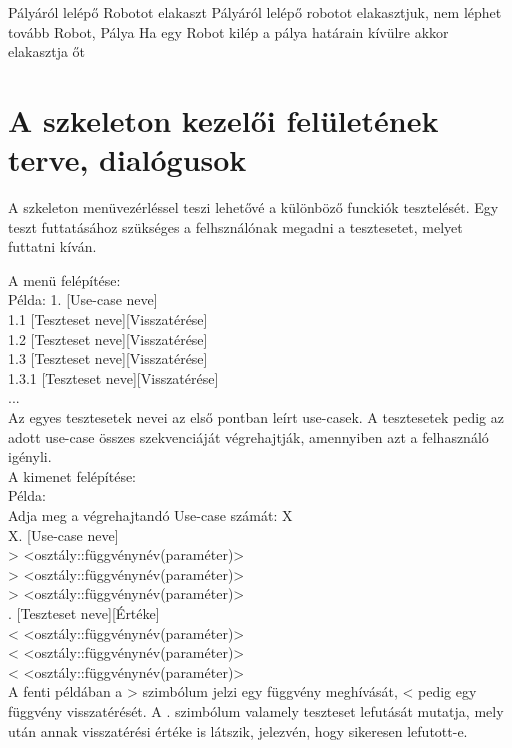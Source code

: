 \usecase%
{Pályáról lelépő Robotot elakaszt}%
{Pályáról lelépő robotot elakasztjuk, nem léphet tovább}%
{Robot, Pálya}%
{Ha egy Robot kilép a pálya határain kívülre akkor elakasztja őt}

\section{A szkeleton kezelői felületének terve, dialógusok}
A szkeleton menüvezérléssel teszi lehetővé a különböző funckiók tesztelését. Egy teszt futtatásához szükséges a felhsználónak
megadni a tesztesetet, melyet futtatni kíván. 

A menü felépítése: \\

Példa:
1. [Use-case neve] \\
1.1 [Teszteset neve][Visszatérése] \\
1.2 [Teszteset neve][Visszatérése] \\
1.3 [Teszteset neve][Visszatérése] \\
   1.3.1 [Teszteset neve][Visszatérése] \\
... \\

Az egyes tesztesetek nevei az első pontban leírt use-casek. A tesztesetek pedig
az adott use-case összes szekvenciáját végrehajtják, amennyiben azt a felhasználó igényli. \\

A kimenet felépítése: \\

Példa: \\

Adja meg a végrehajtandó Use-case számát: X \\
X. [Use-case neve] \\
>   <osztály::függvénynév(paraméter)> \\
>         <osztály::függvénynév(paraméter)> \\
>               <osztály::függvénynév(paraméter)> \\
.                    [Teszteset neve][Értéke] \\
<               <osztály::függvénynév(paraméter)> \\
<         <osztály::függvénynév(paraméter)> \\
<   <osztály::függvénynév(paraméter)> \\

A fenti példában a > szimbólum jelzi egy függvény meghívását, < pedig egy függvény
visszatérését. A . szimbólum valamely teszteset lefutását mutatja, mely után annak 
visszatérési értéke is látszik, jelezvén, hogy sikeresen lefutott-e. \\


